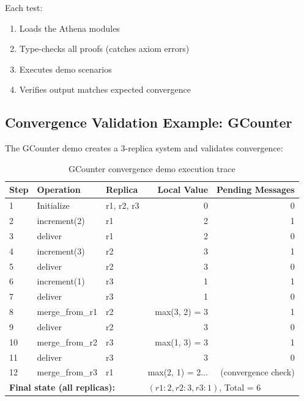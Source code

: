 Each test:
\begin{enumerate}
  \item Loads the Athena modules
  \item Type-checks all proofs (catches axiom errors)
  \item Executes demo scenarios
  \item Verifies output matches expected convergence
\end{enumerate}

\subsection{Convergence Validation Example: GCounter}

The GCounter demo creates a 3-replica system and validates convergence:

\begin{table}[t]
  \centering
  \caption{GCounter convergence demo execution trace}
  \label{tab:gcounter-demo}
  \small
  \begin{tabular}{lllrr}
    \toprule
    \textbf{Step} & \textbf{Operation} & \textbf{Replica} & \textbf{Local Value} & \textbf{Pending Messages}\\
    \midrule
    1 & Initialize & r1, r2, r3 & 0 & 0\\
    2 & increment(2) & r1 & 2 & 1\\
    3 & deliver & r1 & 2 & 0\\
    4 & increment(3) & r2 & 3 & 1\\
    5 & deliver & r2 & 3 & 0\\
    6 & increment(1) & r3 & 1 & 1\\
    7 & deliver & r3 & 1 & 0\\
    8 & merge\_from\_r1 & r2 & max(3, 2) = 3 & 1\\
    9 & deliver & r2 & 3 & 0\\
    10 & merge\_from\_r2 & r3 & max(1, 3) = 3 & 1\\
    11 & deliver & r3 & 3 & 0\\
    12 & merge\_from\_r3 & r1 & max(2, 1) = 2... & (convergence check)\\
    \midrule
    \multicolumn{3}{l}{\textbf{Final state (all replicas):}} & \multicolumn{2}{l}{$(r1: 2, r2: 3, r3: 1)$, Total = 6}\\
    \bottomrule
  \end{tabular}
\end{table}

